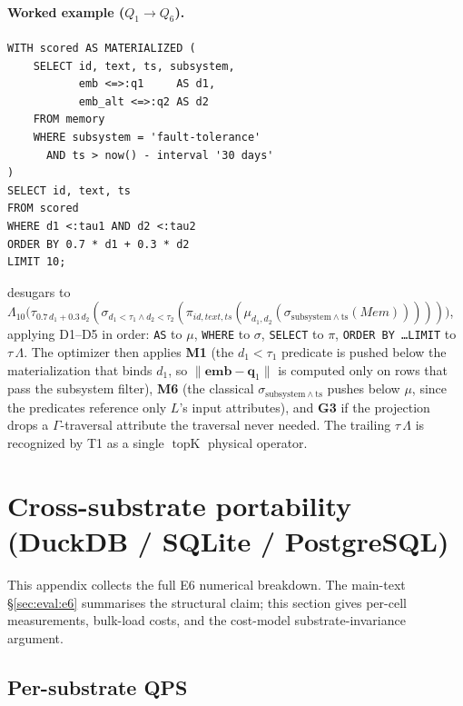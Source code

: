 \documentclass[sigconf]{acmart}
\theoremstyle{plain}
\theoremstyle{definition}
\newcommand{\vect}[1]{\boldsymbol{#1}}
\newcommand{\Mem}{\mathit{Mem}}
\newcommand{\topK}{\operatorname{topK}}
\theoremstyle{remark}
\begin{document}
\paragraph{Worked example ($Q_1 \to Q_6$).}
\begin{lstlisting}
WITH scored AS MATERIALIZED (
    SELECT id, text, ts, subsystem,
           emb <=>:q1     AS d1,
           emb_alt <=>:q2 AS d2
    FROM memory
    WHERE subsystem = 'fault-tolerance'
      AND ts > now() - interval '30 days'
)
SELECT id, text, ts
FROM scored
WHERE d1 <:tau1 AND d2 <:tau2
ORDER BY 0.7 * d1 + 0.3 * d2
LIMIT 10;
\end{lstlisting}
desugars to
$\Lambda_{10}\bigl(\tau_{0.7\,d_1+0.3\,d_2}(\sigma_{d_1<\tau_1
\wedge d_2<\tau_2}(\pi_{\mathit{id},\mathit{text},\mathit{ts}}(\mu_{d_1,d_2}(\sigma_{\mathrm{subsystem}\wedge\mathrm{ts}}(\Mem)))))\bigr)$,
applying D1--D5 in order: \texttt{AS} to $\mu$, \texttt{WHERE}
to $\sigma$, \texttt{SELECT} to $\pi$, \texttt{ORDER BY \ldots LIMIT}
to $\tau\,\Lambda$. The optimizer then applies \textbf{M1} (the
$d_1<\tau_1$ predicate is pushed below the materialization that
binds $d_1$, so $\lVert\vect{emb}-\vect{q}_1\rVert$ is computed
only on rows that pass the subsystem filter), \textbf{M6} (the
classical $\sigma_{\mathrm{subsystem} \wedge \mathrm{ts}}$ pushes
below $\mu$, since the predicates reference only $L$'s input
attributes), and \textbf{G3} if the projection drops a
$\Gamma$-traversal attribute the traversal never needed. The
trailing $\tau\,\Lambda$ is recognized by T1 as a single
$\topK$ physical operator.



\section{Cross-substrate portability (DuckDB / SQLite / PostgreSQL)}\label{app:cross-substrate}

This appendix collects the full E6 numerical breakdown. The
main-text \S\ref{sec:eval:e6} summarises the structural
claim; this section gives per-cell measurements, bulk-load
costs, and the cost-model substrate-invariance argument.

\subsection*{Per-substrate QPS}
\end{document}
